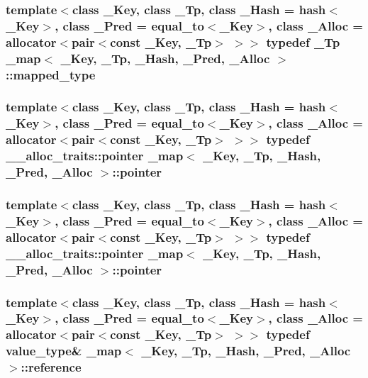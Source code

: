 \subsubsection[{mapped\+\_\+type}]{\setlength{\rightskip}{0pt plus 5cm}template$<$class \+\_\+\+Key, class \+\_\+\+Tp, class \+\_\+\+Hash = hash$<$\+\_\+\+Key$>$, class \+\_\+\+Pred = equal\+\_\+to$<$\+\_\+\+Key$>$, class \+\_\+\+Alloc = allocator$<$pair$<$const \+\_\+\+Key, \+\_\+\+Tp$>$ $>$$>$ typedef \+\_\+\+Tp {\bf \+\_\+map}$<$ \+\_\+\+Key, \+\_\+\+Tp, \+\_\+\+Hash, \+\_\+\+Pred, \+\_\+\+Alloc $>$\+::{\bf mapped\+\_\+type}}\label{class__map_a652392c4150010664c8b1b76e460ae0a}
\hypertarget{class__map_aaa37e465530f795edf03ac133f0a9a60}{}
\subsubsection[{pointer}]{\setlength{\rightskip}{0pt plus 5cm}template$<$class \+\_\+\+Key, class \+\_\+\+Tp, class \+\_\+\+Hash = hash$<$\+\_\+\+Key$>$, class \+\_\+\+Pred = equal\+\_\+to$<$\+\_\+\+Key$>$, class \+\_\+\+Alloc = allocator$<$pair$<$const \+\_\+\+Key, \+\_\+\+Tp$>$ $>$$>$ typedef \+\_\+\+\_\+alloc\+\_\+traits\+::pointer {\bf \+\_\+map}$<$ \+\_\+\+Key, \+\_\+\+Tp, \+\_\+\+Hash, \+\_\+\+Pred, \+\_\+\+Alloc $>$\+::{\bf pointer}}\label{class__map_aaa37e465530f795edf03ac133f0a9a60}
\hypertarget{class__map_aaa37e465530f795edf03ac133f0a9a60}{}
\subsubsection[{pointer}]{\setlength{\rightskip}{0pt plus 5cm}template$<$class \+\_\+\+Key, class \+\_\+\+Tp, class \+\_\+\+Hash = hash$<$\+\_\+\+Key$>$, class \+\_\+\+Pred = equal\+\_\+to$<$\+\_\+\+Key$>$, class \+\_\+\+Alloc = allocator$<$pair$<$const \+\_\+\+Key, \+\_\+\+Tp$>$ $>$$>$ typedef \+\_\+\+\_\+alloc\+\_\+traits\+::pointer {\bf \+\_\+map}$<$ \+\_\+\+Key, \+\_\+\+Tp, \+\_\+\+Hash, \+\_\+\+Pred, \+\_\+\+Alloc $>$\+::{\bf pointer}}\label{class__map_aaa37e465530f795edf03ac133f0a9a60}
\hypertarget{class__map_a1c5ff1b6621aa3b9adc9bb651ffd4969}{}
\subsubsection[{reference}]{\setlength{\rightskip}{0pt plus 5cm}template$<$class \+\_\+\+Key, class \+\_\+\+Tp, class \+\_\+\+Hash = hash$<$\+\_\+\+Key$>$, class \+\_\+\+Pred = equal\+\_\+to$<$\+\_\+\+Key$>$, class \+\_\+\+Alloc = allocator$<$pair$<$const \+\_\+\+Key, \+\_\+\+Tp$>$ $>$$>$ typedef {\bf value\+\_\+type}\& {\bf \+\_\+map}$<$ \+\_\+\+Key, \+\_\+\+Tp, \+\_\+\+Hash, \+\_\+\+Pred, \+\_\+\+Alloc $>$\+::{\bf reference}}\label{class__map_a1c5ff1b6621aa3b9adc9bb651ffd4969}
\hypertarget{class__map_a1c5ff1b6621aa3b9adc9bb651ffd4969}{}
